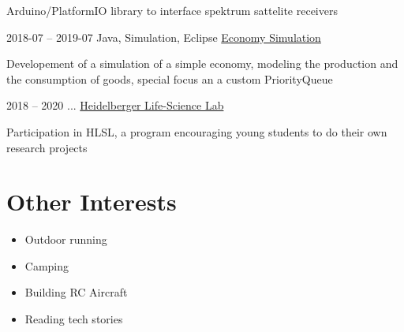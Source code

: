 \documentclass{tccv}
\begin{document}
\begin{eventlist}
	Arduino/PlatformIO library to interface spektrum sattelite receivers 

\item{ 2018-07 -- 2019-07 }
	{ Java, Simulation, Eclipse }
	{ \href{https://github.com/peteole/economySim}{Economy Simulation} }

	Developement of a simulation of a simple economy, modeling the production and the consumption of goods, special focus an a custom PriorityQueue 

\item{ 2018 -- 2020 }
	{ ... }
	{ \href{https://www.life-science-lab.org/cms/}{Heidelberger Life-Science Lab} }

	Participation in HLSL, a program encouraging young students to do their own research projects 
	

\end{eventlist}

\section{Other Interests}
\begin{itemize}

\item Outdoor running

\item Camping

\item Building RC Aircraft

\item Reading tech stories

\end{itemize}
\end{document}
